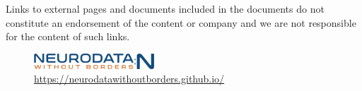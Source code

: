 \documentclass{article}
\begin{document}
Links to external pages and documents included in the documents do not constitute
an endorsement of the content or company and we are not responsible for the 
content of such links.

\begin{figure}[b!]
\vspace{1cm}
\centering
\includegraphics[width=0.4\textwidth]{figures/nwb_n_logo.png} \\
\href{https://neurodatawithoutborders.github.io/}{https://neurodatawithoutborders.github.io/}
\end{figure}
\end{document}
